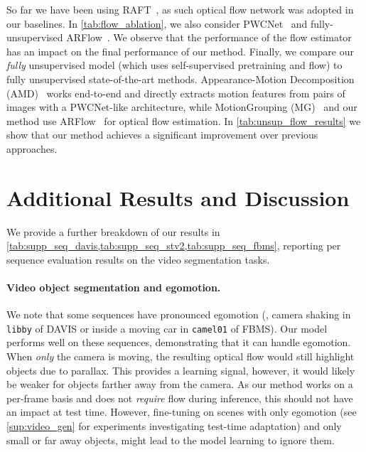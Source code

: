 So far we have been using RAFT~\cite{teed2020raft}, as such optical flow network was adopted in our baselines.
In \cref{tab:flow_ablation}, we also consider PWCNet~\cite{sun2018pwcnet} and fully-unsupervised ARFlow~\cite{liu2020learning}.
We observe that the performance of the flow estimator has an impact on the final performance of our method.
Finally, we compare our \emph{fully} unsupervised model (which uses self-supervised pretraining and flow) to fully unsupervised state-of-the-art methods.
Appearance-Motion Decomposition (AMD)~\cite{liu2021emergence} works end-to-end and directly extracts motion features from pairs of images with a PWCNet-like architecture, while MotionGrouping (MG)~\cite{yang2021self-supervised} and our method use ARFlow~\cite{liu2020learning} for optical flow estimation.
In \cref{tab:unsup_flow_results} we show that our method achieves a significant improvement over previous approaches.


\section{Additional Results and Discussion}\label{sup:sec4}
We provide a further breakdown of our results in \cref{tab:supp_seq_davis,tab:supp_seq_stv2,tab:supp_seq_fbms}, reporting per sequence evaluation results on the video segmentation tasks.

\paragraph{Video object segmentation and egomotion.}
We note that some sequences have pronounced egomotion (\eg, camera shaking in \texttt{libby} of DAVIS or inside a moving car in \texttt{camel01} of FBMS). 
Our model performs well on these sequences, demonstrating that it can handle egomotion. 
When \emph{only} the camera is moving, the resulting optical flow would still highlight objects due to parallax.
This provides a learning signal, however, it would likely be
weaker for objects farther away from the camera.
As our method works on a per-frame basis and does not \emph{require} flow during inference, this should not have an impact at test time. 
However, fine-tuning on scenes with only egomotion (see \cref{sup:video_gen} for experiments investigating test-time adaptation)   and only small or far away objects, might lead to the model learning to ignore them.

